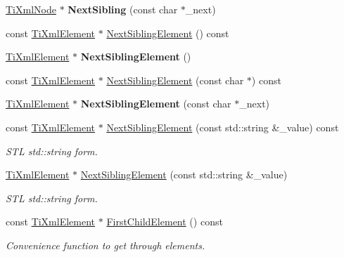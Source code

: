 \begin{DoxyCompactItemize}
\hyperlink{class_ti_xml_node}{Ti\+Xml\+Node} $\ast$ {\bfseries Next\+Sibling} (const char $\ast$\+\_\+next)
\item 
const \hyperlink{class_ti_xml_element}{Ti\+Xml\+Element} $\ast$ \hyperlink{class_ti_xml_node_ac6105781c913a42aa7f3f17bd1964f7c}{Next\+Sibling\+Element} () const
\item 
\hypertarget{class_ti_xml_node_a1b211cb5034655a04358e0e2f6fc5010}{}\label{class_ti_xml_node_a1b211cb5034655a04358e0e2f6fc5010} 
\hyperlink{class_ti_xml_element}{Ti\+Xml\+Element} $\ast$ {\bfseries Next\+Sibling\+Element} ()
\item 
const \hyperlink{class_ti_xml_element}{Ti\+Xml\+Element} $\ast$ \hyperlink{class_ti_xml_node_a22def4746238abaee042f99b47ef3c94}{Next\+Sibling\+Element} (const char $\ast$) const
\item 
\hypertarget{class_ti_xml_node_a6e1ac6b800e18049bc75e9f8e63a8e5f}{}\label{class_ti_xml_node_a6e1ac6b800e18049bc75e9f8e63a8e5f} 
\hyperlink{class_ti_xml_element}{Ti\+Xml\+Element} $\ast$ {\bfseries Next\+Sibling\+Element} (const char $\ast$\+\_\+next)
\item 
\hypertarget{class_ti_xml_node_a2dd7a81689a717fe5d15b3520879ff00}{}\label{class_ti_xml_node_a2dd7a81689a717fe5d15b3520879ff00} 
const \hyperlink{class_ti_xml_element}{Ti\+Xml\+Element} $\ast$ \hyperlink{class_ti_xml_node_a2dd7a81689a717fe5d15b3520879ff00}{Next\+Sibling\+Element} (const std\+::string \&\+\_\+value) const
\begin{DoxyCompactList}\small\item\em S\+TL std\+::string form. \end{DoxyCompactList}\item 
\hypertarget{class_ti_xml_node_a506958e34406729a4e4c5326ea39d081}{}\label{class_ti_xml_node_a506958e34406729a4e4c5326ea39d081} 
\hyperlink{class_ti_xml_element}{Ti\+Xml\+Element} $\ast$ \hyperlink{class_ti_xml_node_a506958e34406729a4e4c5326ea39d081}{Next\+Sibling\+Element} (const std\+::string \&\+\_\+value)
\begin{DoxyCompactList}\small\item\em S\+TL std\+::string form. \end{DoxyCompactList}\item 
\hypertarget{class_ti_xml_node_a12c973e1da9e90a178924b8ea5a5f4d1}{}\label{class_ti_xml_node_a12c973e1da9e90a178924b8ea5a5f4d1} 
const \hyperlink{class_ti_xml_element}{Ti\+Xml\+Element} $\ast$ \hyperlink{class_ti_xml_node_a12c973e1da9e90a178924b8ea5a5f4d1}{First\+Child\+Element} () const
\begin{DoxyCompactList}\small\item\em Convenience function to get through elements. \end{DoxyCompactList}\item 

\end{DoxyCompactItemize}
